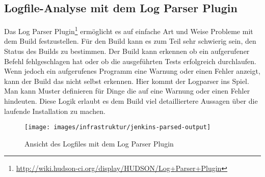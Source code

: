 \subsection{Logfile-Analyse mit dem Log Parser Plugin}
Das Log Parser Plugin\footnote{\url{http://wiki.hudson-ci.org/display/HUDSON/Log+Parser+Plugin}} ermöglicht es auf einfache Art und Weise Probleme mit dem Build festzustellen. Für den Build kann es zum Teil sehr schwierig sein, den Status des Builds zu bestimmen. Der Build kann erkennen ob ein aufgerufener Befehl fehlgeschlagen hat oder ob die ausgeführten Tests erfolgreich durchlaufen. Wenn jedoch ein aufgerufenes Programm eine Warnung oder einen Fehler anzeigt, kann der Build das nicht selbst erkennen. Hier kommt der Logparser ins Spiel. Man kann Muster definieren für Dinge die auf eine Warnung oder einen Fehler hindeuten. Diese Logik erlaubt es dem Build viel detailliertere Aussagen über die laufende Installation zu machen.

\begin{figure}[!h]
	\centering
	\texttt{[image: images/infrastruktur/jenkins-parsed-output]}
	\caption{Ansicht des Logfiles mit dem Log Parser Plugin}
	\label{jenkins-parsed-output}
\end{figure}

